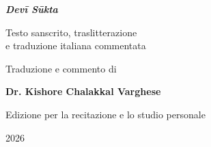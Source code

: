 
\begin{titlepage}
  \thispagestyle{empty}
  \begin{center}
    \vspace*{0.18\textheight}

    {\LARGE \bfseries \textit{Devī Sūkta}\par}
    \vspace{1em}
    {\large Testo sanscrito, traslitterazione\\
    e traduzione italiana commentata\par}

    \vspace{3em}
    {}

    \vfill

    {\large Traduzione e commento di\par}
    \vspace{0.5em}
    {\Large\bfseries Dr. Kishore Chalakkal Varghese\par}

    \vfill

    {\normalsize
      Edizione per la recitazione e lo studio personale\par
    }

    \vspace{2em}
    {\normalsize
      \textsc{2026}\\
        \par
    }

    \vspace*{0.05\textheight}
  \end{center}
\end{titlepage}
